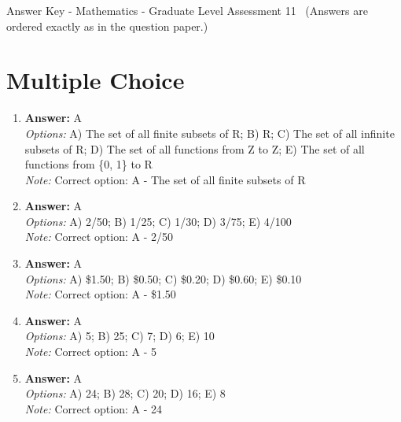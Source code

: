 \documentclass[12pt]{article}
\begin{document}
\begin{center}
Answer Key - Mathematics - Graduate Level Assessment 11 \
\small (Answers are ordered exactly as in the question paper.)
\end{center}

\section*{Multiple Choice}
\begin{enumerate}[label=\arabic*.]
\item \textbf{Answer:} A
\\ \textit{Options:} A) The set of all finite subsets of R; B) R; C) The set of all infinite subsets of R; D) The set of all functions from Z to Z; E) The set of all functions from \{0, 1\} to R
\\ \textit{Note:} Correct option: A - The set of all finite subsets of R
\item \textbf{Answer:} A
\\ \textit{Options:} A) 2/50; B) 1/25; C) 1/30; D) 3/75; E) 4/100
\\ \textit{Note:} Correct option: A - 2/50
\item \textbf{Answer:} A
\\ \textit{Options:} A) \$1.50; B) \$0.50; C) \$0.20; D) \$0.60; E) \$0.10
\\ \textit{Note:} Correct option: A - \$1.50
\item \textbf{Answer:} A
\\ \textit{Options:} A) 5; B) 25; C) 7; D) 6; E) 10
\\ \textit{Note:} Correct option: A - 5
\item \textbf{Answer:} A
\\ \textit{Options:} A) 24; B) 28; C) 20; D) 16; E) 8
\\ \textit{Note:} Correct option: A - 24
\end{enumerate}
\end{document}
